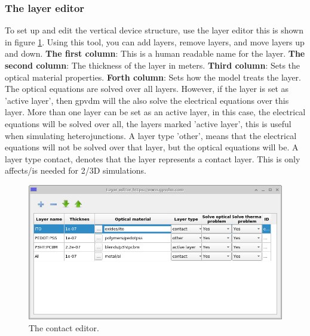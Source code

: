 

\subsubsection{The layer editor}
To set up and edit the vertical device structure, use the layer editor this is shown in figure \ref{fig:layer_editor}. Using this tool, you can add layers, remove layers, and move layers up and down.
\linebreak
\linebreak 
\textbf{The first column}: This is a human readable name for the layer.
\linebreak 
\linebreak 
\textbf{The second column}: The thickness of the layer in meters.
\linebreak
\linebreak 
\textbf{Third column}: Sets the optical material properties.
\linebreak
\linebreak 
\textbf{Forth column}: Sets how the model treats the layer.  The optical equations are solved over all layers.  However, if the layer is set as 'active layer', then gpvdm will the also solve the electrical equations over this layer.  More than one layer can be set as an active layer, in this case, the electrical equations will be solved over all, the layers marked 'active layer', this is useful when simulating heterojunctions.  A layer type 'other', means that the electrical equations will not be solved over that layer, but the optical equations will be.  A layer type contact, denotes that the layer represents a contact layer.  This is only affects/is needed for 2/3D simulations.


\begin{figure}[ht!]
\centering
\includegraphics[width=\textwidth]{./images/layer_editor.png}
{\caption{The contact editor.}}
\label{fig:layer_editor}
\end{figure}

